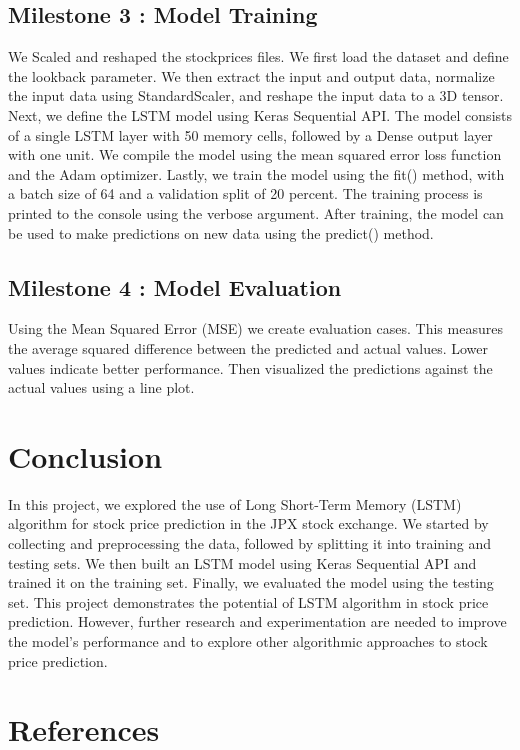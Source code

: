 \documentclass{article}
\begin{document}
\subsection{Milestone 3 : Model Training }
We Scaled and reshaped the stockprices files.
We first load the dataset and define the lookback parameter. We then extract the input and output data, normalize the input data using StandardScaler, and reshape the input data to a 3D tensor. 
Next, we define the LSTM model using Keras Sequential API. The model consists of a single LSTM layer with 50 memory cells, followed by a Dense output layer with one unit. We compile the model using the mean squared error loss function and the Adam optimizer.
Lastly, we train the model using the fit() method, with a batch size of 64 and a validation split of 20 percent. The training process is printed to the console using the verbose argument. After training, the model can be used to make predictions on new data using the predict() method.

\subsection{Milestone 4 : Model Evaluation }
Using the Mean Squared Error (MSE) we create evaluation cases. This measures the average squared difference between the predicted and actual values. Lower values indicate better performance.
Then visualized the predictions against the actual values using a line plot. 

\section{Conclusion}
In this project, we explored the use of Long Short-Term Memory (LSTM) algorithm for stock price prediction in the JPX stock exchange. We started by collecting and preprocessing the data, followed by splitting it into training and testing sets. We then built an LSTM model using Keras Sequential API and trained it on the training set. Finally, we evaluated the model using the testing set.
This project demonstrates the potential of LSTM algorithm in stock price prediction. However, further research and experimentation are needed to improve the model's performance and to explore other algorithmic approaches to stock price prediction.

\section{References}
\end{document}

